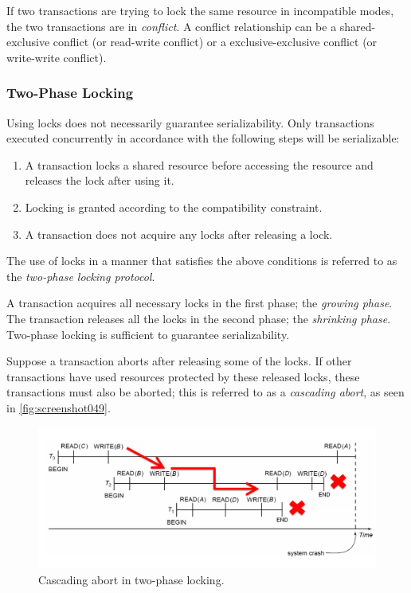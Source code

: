 If two transactions are trying to lock the same resource in incompatible modes, the two transactions are in \textit{conflict}. A conflict relationship can be a shared-exclusive conflict (or read-write conflict) or a exclusive-exclusive conflict (or write-write conflict).

\subsubsection{Two-Phase Locking}
Using locks does not necessarily guarantee serializability. Only transactions executed concurrently in accordance with the following steps will be serializable: \begin{enumerate}
\item A transaction locks a shared resource before accessing the resource and releases the lock after using it.
\item Locking is granted according to the compatibility constraint.
\item A transaction does not acquire any locks after releasing a lock.
\end{enumerate}
The use of locks in a manner that satisfies the above conditions is referred to as the \textit{two-phase locking protocol}.

A transaction acquires all necessary locks in the first phase; the \textit{growing phase}. The transaction releases all the locks in the second phase; the \textit{shrinking phase}. Two-phase locking is sufficient to guarantee serializability.

Suppose a transaction aborts after releasing some of the locks. If other transactions have used resources protected by these released locks, these transactions must also be aborted; this is referred to as a \textit{cascading abort}, as seen in \autoref{fig:screenshot049}.

\begin{figure}
\centering
\includegraphics[width=0.7\linewidth]{screenshot049}
\caption{Cascading abort in two-phase locking.}
\label{fig:screenshot049}
\end{figure}

